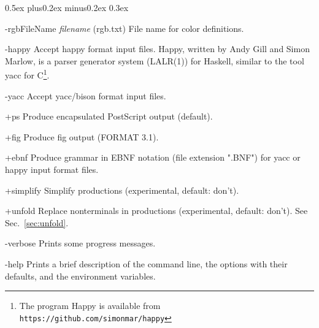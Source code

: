 \documentclass{article}
\newenvironment{bfscript}[1]{%
  \begin{list}{}{\settowidth{\labelwidth}{\bf #1}
      \setlength{\leftmargin}{\labelwidth}
      \addtolength{\leftmargin}{\labelsep}
      \parsep0.5ex plus0.2ex minus0.2ex \itemsep 0.3ex
      \renewcommand{\makelabel}[1]{\bf ##1\hfill}}}
  {\end{list}}
\newcommand{\new}{%
        {\ooalign {\hfil \raise .09ex
         \hbox {n}\hfil \crcr\mathhexbox 20D}}}
\begin{document}
\begin{bfscript}{\qquad}
\item[-rgbFileName    \emph{filename}] (rgb.txt) File name for color definitions.
\item[-happy] Accept happy format input files. Happy, written by Andy Gill and Simon Marlow,
  is a parser generator system (LALR(1)) for Haskell, similar to the tool yacc for C\footnote{The
  program Happy is available from \texttt{https://github.com/simonmar/happy}}.
\item[-yacc] Accept yacc/bison format input files.\new
\item[+ps] Produce encapsulated PostScript output (default).
\item[+fig] Produce fig output (FORMAT 3.1).
\item[+ebnf] Produce grammar in EBNF notation (file extension ".BNF") for yacc or happy
  input format files.\new
\item[+simplify] Simplify productions (experimental, default: don't).
\item[+unfold] Replace nonterminals in productions (experimental, default: don't).
  See Sec.~\ref{sec:unfold}.\new
\item[-verbose] Prints some progress messages.
\item[-help] Prints a brief description of the command line, the options with their defaults,
   and the environment variables.
\end{bfscript}
\end{document}
